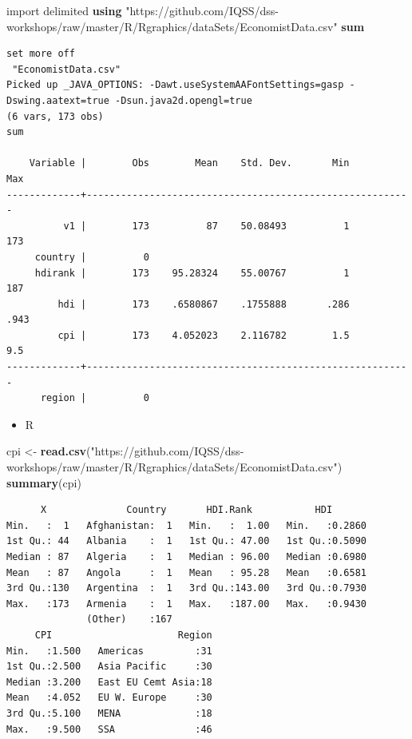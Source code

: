 \documentclass[
]{book}
\newenvironment{Shaded}{\begin{snugshade}}{\end{snugshade}}
\newcommand{\KeywordTok}[1]{\textcolor[rgb]{0.13,0.29,0.53}{\textbf{#1}}}
\newcommand{\NormalTok}[1]{#1}
\newcommand{\StringTok}[1]{\textcolor[rgb]{0.31,0.60,0.02}{#1}}
\providecommand{\tightlist}{%
  \setlength{\itemsep}{0pt}\setlength{\parskip}{0pt}}
\begin{document}
\begin{Shaded}
\begin{Highlighting}[]
\NormalTok{import delimited }\KeywordTok{using} \StringTok{"https://github.com/IQSS/dss{-}workshops/raw/master/R/Rgraphics/dataSets/EconomistData.csv"}
\KeywordTok{sum}
\end{Highlighting}
\end{Shaded}

\begin{verbatim}
set more off
 "EconomistData.csv"
Picked up _JAVA_OPTIONS: -Dawt.useSystemAAFontSettings=gasp -Dswing.aatext=true -Dsun.java2d.opengl=true
(6 vars, 173 obs)
sum

    Variable |        Obs        Mean    Std. Dev.       Min        Max
-------------+---------------------------------------------------------
          v1 |        173          87    50.08493          1        173
     country |          0
     hdirank |        173    95.28324    55.00767          1        187
         hdi |        173    .6580867    .1755888       .286       .943
         cpi |        173    4.052023    2.116782        1.5        9.5
-------------+---------------------------------------------------------
      region |          0
\end{verbatim}

\begin{itemize}
\tightlist
\item
  R
\end{itemize}

\begin{Shaded}
\begin{Highlighting}[]
\NormalTok{cpi \textless{}{-}}\StringTok{ }\KeywordTok{read.csv}\NormalTok{(}\StringTok{"https://github.com/IQSS/dss{-}workshops/raw/master/R/Rgraphics/dataSets/EconomistData.csv"}\NormalTok{)}
\KeywordTok{summary}\NormalTok{(cpi)}
\end{Highlighting}
\end{Shaded}

\begin{verbatim}
      X              Country       HDI.Rank           HDI        
Min.   :  1   Afghanistan:  1   Min.   :  1.00   Min.   :0.2860  
1st Qu.: 44   Albania    :  1   1st Qu.: 47.00   1st Qu.:0.5090  
Median : 87   Algeria    :  1   Median : 96.00   Median :0.6980  
Mean   : 87   Angola     :  1   Mean   : 95.28   Mean   :0.6581  
3rd Qu.:130   Argentina  :  1   3rd Qu.:143.00   3rd Qu.:0.7930  
Max.   :173   Armenia    :  1   Max.   :187.00   Max.   :0.9430  
              (Other)    :167                                    
     CPI                      Region  
Min.   :1.500   Americas         :31  
1st Qu.:2.500   Asia Pacific     :30  
Median :3.200   East EU Cemt Asia:18  
Mean   :4.052   EU W. Europe     :30  
3rd Qu.:5.100   MENA             :18  
Max.   :9.500   SSA              :46
\end{verbatim}
\end{document}
